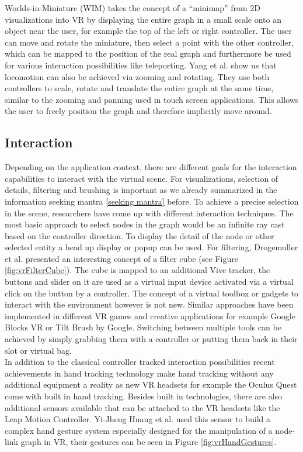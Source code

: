 Worlds-in-Miniature (WIM) \cite{drogemuller_examining_2020} takes the concept of a “minimap” from 2D visualizations into VR by displaying the entire graph in a small scale onto an object near the user, for example the top of the left or right controller. The user can move and rotate the miniature, then select a point with the other controller, which can be mapped to the position of the real graph and furthermore be used for various interaction possibilities like teleporting. Yang et al. \cite{yang_embodied_2020} show us that locomotion can also be achieved via zooming and rotating. They use both controllers to scale, rotate and translate the entire graph at the same time, similar to the zooming and panning used in touch screen applications. This allows the user to freely position the graph and therefore implicitly move around.

\subsection{Interaction}
\label{chap:rw-vrinteraction}

Depending on the application context, there are different goals for the interaction capabilities to interact with the virtual scene. For visualizations, selection of details, filtering and brushing is important as we already summarized in the information seeking mantra \ref{seeking mantra} before. To achieve a precise selection in the scene, researchers have come up with different interaction techniques. The most basic approach to select nodes in the graph would be an infinite ray cast based on the controller direction. To display the detail of the node or other selected entity a head up display or popup can be used. 
For filtering, Drogemuller et al. \cite{drogemuller_vrige_2017} presented an interesting concept of a filter cube (see Figure \ref{fig:vrFilterCube}). The cube is mapped to an additional Vive tracker, the buttons and slider on it are used as a virtual input device activated via a virtual click on the button by a controller. 
The concept of a virtual toolbox or gadgets to interact with the environment however is not new. Similar approaches have been implemented in different VR games and creative applications for example Google Blocks VR or Tilt Brush by Google. Switching between multiple tools can be achieved by simply grabbing them with a controller or putting them back in their slot or virtual bag.\\
In addition to the classical controller tracked interaction possibilities recent achievements in hand tracking technology make hand tracking without any additional equipment a reality as new VR headsets for example the Oculus Quest come with built in hand tracking. Besides built in technologies, there are also additional sensors available that can be attached to the VR headsets like the Leap Motion Controller. Yi-Jheng Huang et al. \cite{yi-jheng_huang_gesture_2017} used this sensor to build a complex hand gesture system especially designed for the manipulation of a node-link graph in VR, their gestures can be seen in Figure \ref{fig:vrHandGestures}. 

